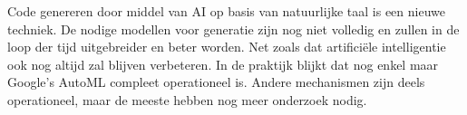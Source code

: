\documentclass[a0,portrait]{a0poster}
\begin{document}
\begin{multicols}{2}
Code genereren door middel van AI op basis van natuurlijke taal is een nieuwe techniek. De nodige modellen voor generatie zijn nog niet volledig en zullen in de loop der tijd uitgebreider en beter worden. Net zoals dat artifici\"ele intelligentie ook nog altijd zal blijven verbeteren. In de praktijk blijkt dat nog enkel maar Google’s AutoML compleet operationeel is. Andere mechanismen zijn deels operationeel, maar de meeste hebben nog meer onderzoek nodig.



\end{multicols}
\end{document}
